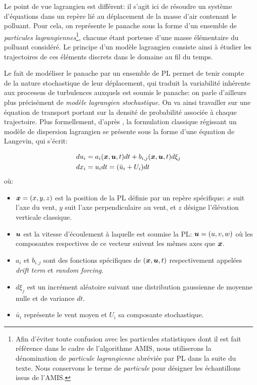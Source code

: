 Le point de vue lagrangien est différent: il s'agit ici de résoudre un système d'équations dans un repère lié au déplacement de la masse d'air contenant le polluant. Pour cela, on représente le panache sous la forme d'un ensemble de \textit{particules lagrangiennes}\footnote{Afin d'éviter toute confusion avec les particules statistiques dont il est fait référence dans le cadre de l'algorithme AMIS, nous utiliserons la dénomination  de \textit{particule lagrangienne} abréviée par PL dans la suite du texte. Nous conservons le terme de \textit{particule} pour désigner les échantillons issus de l'AMIS.}, chacune étant porteuse d'une masse élémentaire du polluant considéré. Le principe d'un modèle lagrangien consiste ainsi à étudier les trajectoires de ces éléments discrets dans le domaine au fil du temps.

Le fait de modéliser le panache par un ensemble de PL permet de tenir compte de la nature stochastique de leur déplacement, qui traduit la variabilité inhérente aux processus de turbulences auxquels est soumis le panache: on parle d'ailleurs plus précisément de \textit{modèle lagrangien stochastique}. On va ainsi travailler sur une équation de transport portant sur la densité de probabilité associée à chaque trajectoire. Plus formellement, d'après \cite{Flesch1995}, la formulation classique régissant un modèle de dispersion lagrangien se présente sous la forme d'une équation de Langevin, qui s'écrit: 

\begin{equation}
	\begin{split}
		du_i &= a_i({\bm{x}}, {\bm{u}}, t)dt + b_{i,j}({\bm{x}}, {\bm{u}}, t)d\xi_j  \\
		dx_i &= u_i dt = (\bar{u}_i + U_i)dt
	\end{split}
	\label{eq_langevin}
\end{equation}
où:
 \begin{itemize}
	\item ${\bm{x}} = (x, y, z)$ est la position de la PL  définie par un repère spécifique: $x$ suit l'axe du vent, $y$ suit l'axe perpendiculaire au vent, et $z$ désigne l'élévation verticale classique. 
	\item ${\bm{u}}$ est la vitesse d'écoulement à laquelle est soumise la PL: ${\bm{u}} = (u, v, w)$ où les composantes respectives de ce vecteur suivent les mêmes axes que ${\bm{x}}$.
	\item $a_i$ et $b_{i,j}$ sont des fonctions spécifiques de $({\bm{x}}, {\bm{u}}, t)$ respectivement appelées \textit{drift term} et \textit{random forcing}.
	\item $d\xi_j$ est un incrément aléatoire suivant une distribution gaussienne de moyenne nulle et de variance $dt$.
	\item $\bar{u}_i$ représente le vent moyen et $U_i$ sa composante stochastique.
	
\end{itemize}

